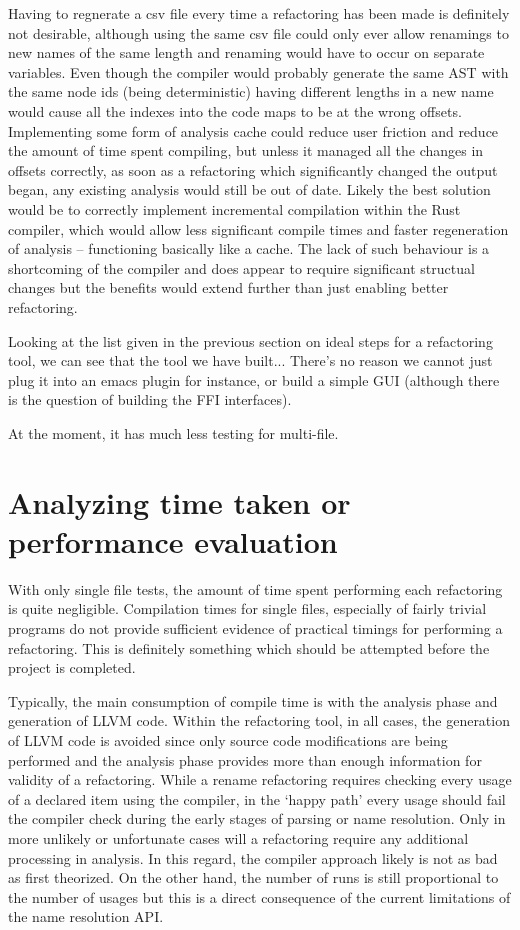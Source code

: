 Having to regnerate a csv file every time a refactoring has been made is definitely not desirable, although using the same csv file could only ever allow renamings to new names of the same length and renaming would have to occur on separate variables. Even though the compiler would probably generate the same AST with the same node ids (being deterministic) having different lengths in a new name would cause all the indexes into the code maps to be at the wrong offsets. Implementing some form of analysis cache could reduce user friction and reduce the amount of time spent compiling, but unless it managed all the changes in offsets correctly, as soon as a refactoring which significantly changed the output began, any existing analysis would still be out of date. Likely the best solution would be to correctly implement incremental compilation within the Rust compiler, which would allow less significant compile times and faster regeneration of analysis -- functioning basically like a cache. The lack of such behaviour is a shortcoming of the compiler and does appear to require significant structual changes but the benefits would extend further than just enabling better refactoring.

Looking at the list given in the previous section on ideal steps for a refactoring tool, we can see that the tool we have built... 
There's no reason we cannot just plug it into an emacs plugin for instance, or build a simple GUI (although there is the question of building the FFI interfaces).

At the moment, it has much less testing for multi-file. 


\section{Analyzing time taken or performance evaluation}
With only single file tests, the amount of time spent performing each refactoring is quite negligible. Compilation times for single files, especially of fairly trivial programs do not provide sufficient evidence of practical timings for performing a refactoring. This is definitely something which should be attempted before the project is completed.

Typically, the main consumption of compile time is with the analysis phase and generation of LLVM code. Within the refactoring tool, in all cases, the generation of LLVM code is avoided since only source code modifications are being performed and the analysis phase provides more than enough information for validity of a refactoring. While a rename refactoring requires checking every usage of a declared item using the compiler, in the `happy path' every usage should fail the compiler check during the early stages of parsing or name resolution. Only in more unlikely or unfortunate cases will a refactoring require any additional processing in analysis. In this regard, the compiler approach likely is not as bad as first theorized. On the other hand, the number of runs is still proportional to the number of usages but this is a direct consequence of the current limitations of the name resolution API.

